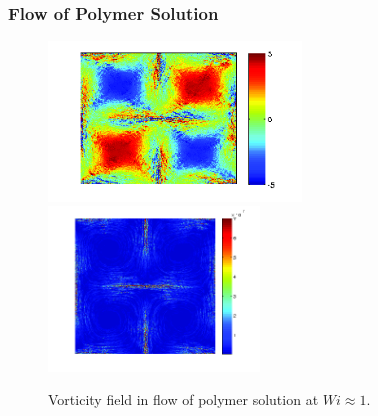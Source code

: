 \begin{frame}
  \frametitle{Flow of Polymer Solution}
  \begin{figure}
    \centering
    \includegraphics[width=0.6\textwidth]{img/polymer_loc-10.png}
  \includegraphics[width=0.5\textwidth]{img/polymer_loc-6.png}
    \caption{Vorticity field in flow of polymer solution at $Wi\approx1$.}
    \label{fig:vor_pol1}
  \end{figure}
\end{frame}

